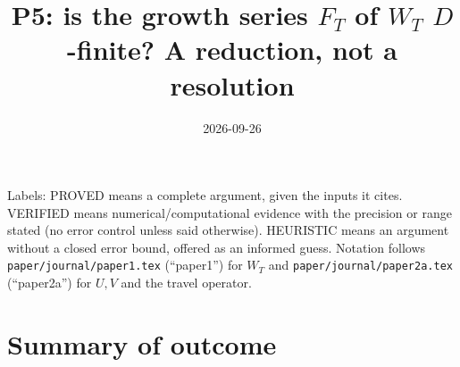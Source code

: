 \documentclass[11pt]{article}
\title{P5: is the growth series $F_T$ of $W_T$ $D$-finite? A reduction, not a resolution}
\date{2026-09-26}
\theoremstyle{remark}
\begin{document}
\maketitle

\noindent Labels: PROVED means a complete argument, given the inputs it cites. VERIFIED means
numerical/computational evidence with the precision or range stated (no error control unless said
otherwise). HEURISTIC means an argument without a closed error bound, offered as an informed guess.
Notation follows \texttt{paper/journal/paper1.tex} (``paper1'') for $W_T$ and
\texttt{paper/journal/paper2a.tex} (``paper2a'') for $U,V$ and the travel operator.

\section*{Summary of outcome}
\end{document}
